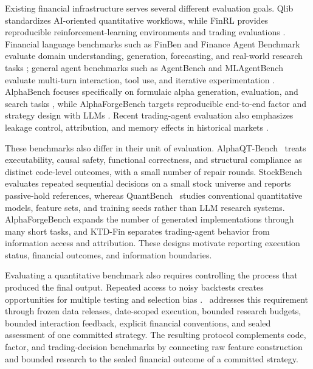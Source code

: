 Existing financial infrastructure serves several different evaluation goals. Qlib standardizes AI-oriented quantitative workflows, while FinRL provides reproducible reinforcement-learning environments and trading evaluations \citep{Yang2020Qlib,Liu2020FinRL}. Financial language benchmarks such as FinBen and Finance Agent Benchmark evaluate domain understanding, generation, forecasting, and real-world research tasks \citep{Xie2024FinBen,Bigeard2025FinanceAgent}; general agent benchmarks such as AgentBench and MLAgentBench evaluate multi-turn interaction, tool use, and iterative experimentation \citep{Liu2023AgentBench,Huang2023MLAgentBench}. AlphaBench focuses specifically on formulaic alpha generation, evaluation, and search tasks \citep{Luo2026AlphaBench}, while AlphaForgeBench targets reproducible end-to-end factor and strategy design with LLMs \citep{Zhang2026AlphaForgeBench}. Recent trading-agent evaluation also emphasizes leakage control, attribution, and memory effects in historical markets \citep{Zhu2026KTDFin}.

These benchmarks also differ in their unit of evaluation. AlphaQT-Bench~\citep{AlphaQTBench2026} treats executability, causal safety, functional correctness, and structural compliance as distinct code-level outcomes, with a small number of repair rounds. StockBench~\citep{StockBench2025} evaluates repeated sequential decisions on a small stock universe and reports passive-hold references, whereas QuantBench~\citep{QuantBench2025} studies conventional quantitative models, feature sets, and training seeds rather than LLM research systems. AlphaForgeBench expands the number of generated implementations through many short tasks, and KTD-Fin separates trading-agent behavior from information access and attribution. These designs motivate reporting execution status, financial outcomes, and information boundaries.

Evaluating a quantitative benchmark also requires controlling the process that produced the final output. Repeated access to noisy backtests creates opportunities for multiple testing and selection bias \citep{Bailey2017Backtest}. \BenchmarkName\ addresses this requirement through frozen data releases, date-scoped execution, bounded research budgets, bounded interaction feedback, explicit financial conventions, and sealed assessment of one committed strategy. The resulting protocol complements code, factor, and trading-decision benchmarks by connecting raw feature construction and bounded research to the sealed financial outcome of a committed strategy.
